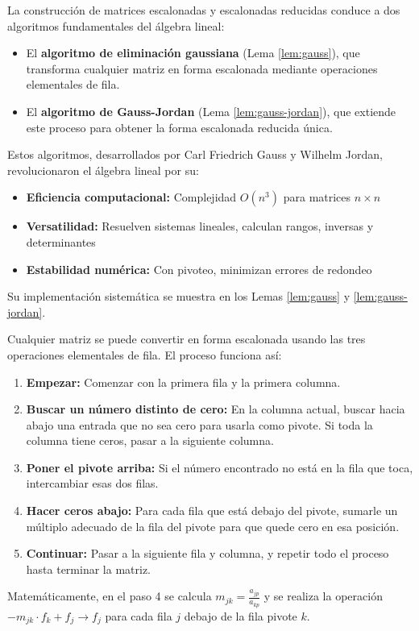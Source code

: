 \begin{rem}\label{rem:gauss}
La construcción de matrices escalonadas y escalonadas reducidas conduce a dos algoritmos fundamentales del álgebra lineal:
\begin{itemize}
\item El \textbf{algoritmo de eliminación gaussiana} (Lema \ref{lem:gauss}), que transforma cualquier matriz en forma escalonada mediante operaciones elementales de fila.
\item El \textbf{algoritmo de Gauss-Jordan} (Lema \ref{lem:gauss-jordan}), que extiende este proceso para obtener la forma escalonada reducida única.
\end{itemize}
Estos algoritmos, desarrollados por Carl Friedrich Gauss y Wilhelm Jordan, revolucionaron el álgebra lineal por su:
\begin{itemize}
\item \textbf{Eficiencia computacional:} Complejidad $O(n^3)$ para matrices $n\times n$
\item \textbf{Versatilidad:} Resuelven sistemas lineales, calculan rangos, inversas y determinantes
\item \textbf{Estabilidad numérica:} Con pivoteo, minimizan errores de redondeo
\end{itemize}
Su implementación sistemática se muestra en los Lemas \ref{lem:gauss} y \ref{lem:gauss-jordan}.
\end{rem}

\begin{lemma}\label{lem:gauss}
Cualquier matriz se puede convertir en forma escalonada usando las tres operaciones elementales de fila. El proceso funciona así:

\begin{enumerate}
    \item \textbf{Empezar:} Comenzar con la primera fila y la primera columna.
    
    \item \textbf{Buscar un número distinto de cero:} En la columna actual, buscar hacia abajo una entrada que no sea cero para usarla como pivote. Si toda la columna tiene ceros, pasar a la siguiente columna.
    
    \item \textbf{Poner el pivote arriba:} Si el número encontrado no está en la fila que toca, intercambiar esas dos filas.
    
    \item \textbf{Hacer ceros abajo:} Para cada fila que está debajo del pivote, sumarle un múltiplo adecuado de la fila del pivote para que quede cero en esa posición.
    
    \item \textbf{Continuar:} Pasar a la siguiente fila y columna, y repetir todo el proceso hasta terminar la matriz.
\end{enumerate}

Matemáticamente, en el paso 4 se calcula $m_{jk} = \frac{a_{jp}}{a_{kp}}$ y se realiza la operación $ - m_{jk} \cdot f_k + f_j \to f_j $ para cada fila $j$ debajo de la fila pivote $k$.
\end{lemma}

